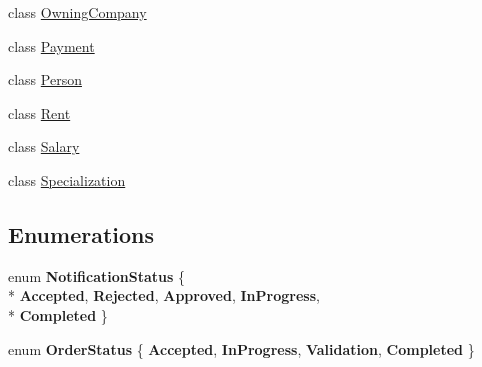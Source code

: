 \begin{DoxyCompactItemize}
\item 
class \hyperlink{class_baudi_1_1_d_a_l_1_1_models_1_1_owning_company}{Owning\+Company}
\item 
class \hyperlink{class_baudi_1_1_d_a_l_1_1_models_1_1_payment}{Payment}
\item 
class \hyperlink{class_baudi_1_1_d_a_l_1_1_models_1_1_person}{Person}
\item 
class \hyperlink{class_baudi_1_1_d_a_l_1_1_models_1_1_rent}{Rent}
\item 
class \hyperlink{class_baudi_1_1_d_a_l_1_1_models_1_1_salary}{Salary}
\item 
class \hyperlink{class_baudi_1_1_d_a_l_1_1_models_1_1_specialization}{Specialization}
\end{DoxyCompactItemize}
\subsection*{Enumerations}
\begin{DoxyCompactItemize}
\item 
\hypertarget{namespace_baudi_1_1_d_a_l_1_1_models_ae78cc492c63bab808bfb3ffd57a33be1}{}enum {\bfseries Notification\+Status} \{ \\*
{\bfseries Accepted}, 
{\bfseries Rejected}, 
{\bfseries Approved}, 
{\bfseries In\+Progress}, 
\\*
{\bfseries Completed}
 \}\label{namespace_baudi_1_1_d_a_l_1_1_models_ae78cc492c63bab808bfb3ffd57a33be1}

\item 
\hypertarget{namespace_baudi_1_1_d_a_l_1_1_models_aa4b2f4a5ada2cad98ec9b7767ef91165}{}enum {\bfseries Order\+Status} \{ {\bfseries Accepted}, 
{\bfseries In\+Progress}, 
{\bfseries Validation}, 
{\bfseries Completed}
 \}\label{namespace_baudi_1_1_d_a_l_1_1_models_aa4b2f4a5ada2cad98ec9b7767ef91165}

\end{DoxyCompactItemize}

